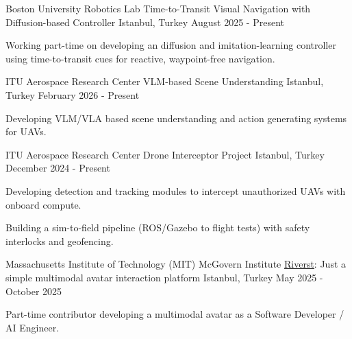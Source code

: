 
\begin{cventries}
    
\cventry
    {Boston University Robotics Lab } %
    {Time-to-Transit Visual Navigation with Diffusion-based Controller} %
    {Istanbul, Turkey} %
    {August 2025 - Present} %
    {
      \begin{cvitems}
        \item {Working part-time on developing an diffusion and imitation-learning controller using time-to-transit cues for reactive, waypoint-free navigation.}
      \end{cvitems}
    }

\cventry
    {ITU Aerospace Research Center} %
    {VLM-based Scene Understanding} %
    {Istanbul, Turkey} %
    {February 2026 - Present} %
    {
      \begin{cvitems}
        \item {Developing VLM/VLA based scene understanding and action generating systems for UAVs.}
      \end{cvitems}
    }


\cventry
    {ITU Aerospace Research Center} %
    {Drone Interceptor Project} %
    {Istanbul, Turkey} %
    {December 2024 - Present} %
    {
      \begin{cvitems}
        \item {Developing detection and tracking modules to intercept unauthorized UAVs with onboard compute.}
        \item {Building a sim-to-field pipeline (ROS/Gazebo to flight tests) with safety interlocks and geofencing.}
      \end{cvitems}
    }


\cventry
    {Massachusetts Institute of Technology (MIT) McGovern Institute} %
    {\href{https://github.com/sensein/riverst}{\underline{Riverst}}: Just a simple multimodal avatar interaction platform} %
    {Istanbul, Turkey} %
    {May 2025 - October 2025} %
    {
      \begin{cvitems}
        \item {Part-time contributor developing a multimodal avatar as a Software Developer / AI Engineer.}
      \end{cvitems}
    }


\end{cventries}
